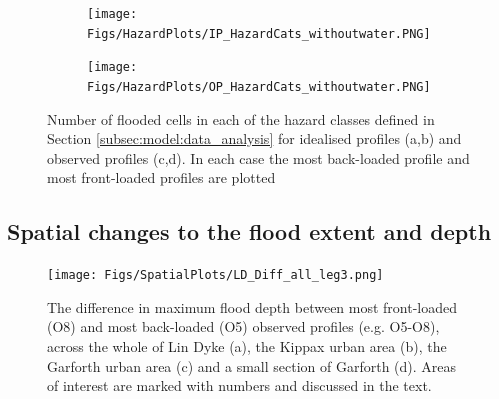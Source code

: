 \documentclass[APA,Times2COL]{WileyNJDv5}
\begin{document}
\begin{figure}[!t] 
\begin{subfigure}[H]{\linewidth}
\texttt{[image: Figs/HazardPlots/IP\_HazardCats\_withoutwater.PNG]}
\end{subfigure}
\begin{subfigure}[H]{\linewidth}
\texttt{[image: Figs/HazardPlots/OP\_HazardCats\_withoutwater.PNG]}
\end{subfigure}
 \caption{Number of flooded cells in each of the hazard classes defined in Section \ref{subsec:model:data_analysis} for idealised profiles (a,b) and observed profiles (c,d). In each case the most back-loaded profile and most front-loaded profiles are plotted}\label{fig:hazard_plots} 
\end{figure}


\subsection{Spatial changes to the flood extent and depth}\label{subsec:model}
\begin{figure}[h!]
  \centering
 \texttt{[image: Figs/SpatialPlots/LD\_Diff\_all\_leg3.png]}
  \caption{The difference in maximum flood depth between most front-loaded (O8) and most back-loaded (O5) observed profiles (e.g. O5-O8), across the whole of Lin Dyke (a), the Kippax urban area (b), the Garforth urban area (c) and a small section of Garforth (d). Areas of interest are marked with numbers and discussed in the text. }\label{fig:flooded_area_spatial_diff} 
\end{figure}
\end{document}
